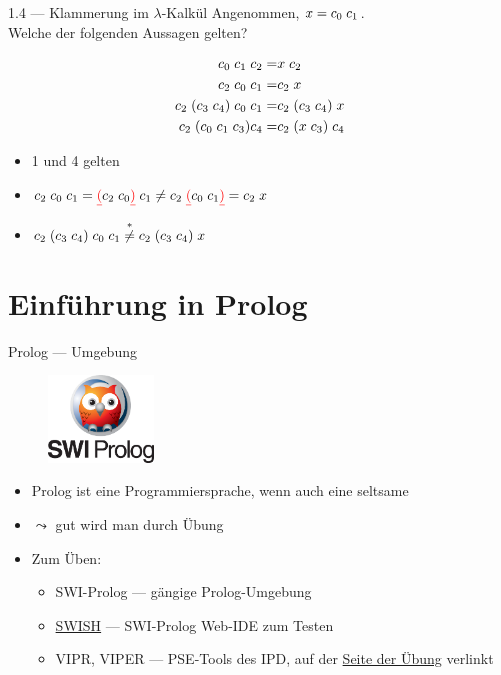 \documentclass{beamer}
\begin{document}
\setcounter{equation}{0}

\begin{frame}{1.4 --- Klammerung im $\lambda$-Kalkül}
	Angenommen, $x = c_0\;{}c_1$.\\
	Welche der folgenden Aussagen gelten?

	\begin{eqnarray}
		c_0\;{}c_1\;{}c_2                 =& x\;{}c_2 \\
		c_2\;{}c_0\;{}c_1                 =& c_2\;{}x \\
		c_2\;{}(c_3\;{}c_4)\;{}c_0\;{}c_1  =& c_2\;{}(c_3\;{}c_4)\;{}x \\
		c_2\;{}(c_0\;{}c_1\;{}c_3){c_4} =& c_2\;{}(x\;{}c_3)\;{}c_4
	\end{eqnarray}

	\pause

	\begin{itemize}
		\item 1 und 4 gelten
		\item $c_2\;{}c_0\;{}c_1 = \textcolor{red}{\underline{(}}c_2\;{}c_0\textcolor{red}{\underline{)}}\;{}c_1 \neq c_2\;{}\textcolor{red}{\underline{(}}c_0\;{}c_1\textcolor{red}{\underline{)}} = c_2\;{}x$
		\item $c_2\;{}(c_3\;{}c_4)\;{}c_0\;{}c_1 \stackrel{*}{\neq} c_2\;{}(c_3\;{}c_4)\;{}x$
	\end{itemize}
\end{frame}

\section{Einführung in Prolog}

\begin{frame}{Prolog --- Umgebung}
  \begin{figure}
    \includegraphics[width=0.25\textwidth]{images/swipl}
  \end{figure}
	\begin{itemize}
		\item Prolog ist eine Programmiersprache, wenn auch eine seltsame
		\item $\leadsto$ gut wird man durch Übung
		\item Zum Üben:
		\begin{itemize}
			\item SWI-Prolog --- gängige Prolog-Umgebung
			\item \href{https://swish.swi-prolog.org/}{SWISH} --- SWI-Prolog Web-IDE zum Testen
			\item VIPR, VIPER --- PSE-Tools des IPD, auf der \href{https://pp.ipd.kit.edu/lehre/WS202021/paradigmen/uebung/}{Seite der Übung} verlinkt
		\end{itemize}
	\end{itemize}
\end{frame}
\end{document}
